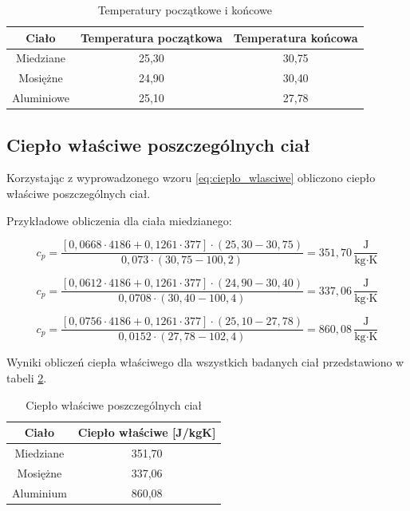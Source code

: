 \documentclass[a4paper,12pt]{article}
\begin{document}
\begin{table}[h]
    \centering
    \begin{tabular}{|c|c|c|}
        \hline
        \textbf{Ciało} & \textbf{Temperatura początkowa} & \textbf{Temperatura końcowa} \\
        \hline
        Miedziane & 25{,}30 & 30{,}75 \\
        \hline
        Mosiężne & 24{,}90 & 30{,}40 \\
        \hline
        Aluminiowe & 25{,}10 & 27{,}78 \\
        \hline
    \end{tabular}
    \caption{Temperatury początkowe i końcowe}
    \label{tab:temperatury}
\end{table}




\subsection{Ciepło właściwe poszczególnych ciał}

Korzystając z wyprowadzonego wzoru \ref{eq:cieplo_wlasciwe} obliczono ciepło właściwe poszczególnych ciał.

Przykładowe obliczenia dla ciała miedzianego:

\begin{equation}
    c_p = \frac{[0{,}0668 \cdot 4186 + 0{,}1261 \cdot 377] \cdot (25{,}30 - 30{,}75)}{0{,}073 \cdot (30{,}75 - 100{,}2)} = 351{,}70\,\frac{\text{J}}{\text{kg} \cdot \text{K}}
\end{equation}

\begin{equation}
    c_p = \frac{[0{,}0612 \cdot 4186 + 0{,}1261 \cdot 377] \cdot (24{,}90 - 30{,}40)}{0{,}0708 \cdot (30{,}40 - 100{,}4)} = 337{,}06\,\frac{\text{J}}{\text{kg} \cdot \text{K}}
\end{equation}

\begin{equation}
    c_p = \frac{[0{,}0756 \cdot 4186 + 0{,}1261 \cdot 377] \cdot (25{,}10 - 27{,}78)}{0{,}0152 \cdot (27{,}78 - 102{,}4)} = 860{,}08\,\frac{\text{J}}{\text{kg} \cdot \text{K}}
\end{equation}

Wyniki obliczeń ciepła właściwego dla wszystkich badanych ciał przedstawiono w tabeli \ref{tab:cieplo_wlasciwe}.

\begin{table}[H]
    \centering
    \begin{tabular}{|c|c|}
        \hline
        \textbf{Ciało} & \textbf{Ciepło właściwe [J/kgK]} \\
        \hline
        Miedziane & 351{,}70 \\
        \hline
        Mosiężne & 337{,}06 \\
        \hline
        Aluminium & 860{,}08 \\
        \hline
    \end{tabular}
    \caption{Ciepło właściwe poszczególnych ciał}
    \label{tab:cieplo_wlasciwe}
\end{table}
\end{document}
